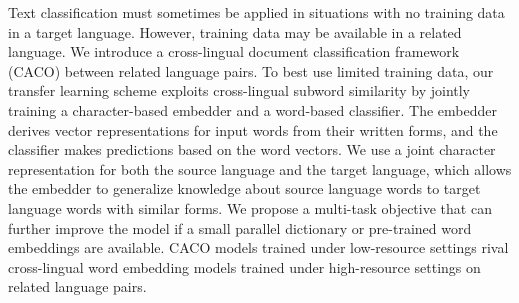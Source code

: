 Text classification must sometimes be applied in situations with no training data in a target language. However, training data may be available in a related language. We introduce a cross-lingual document classification framework (CACO) between related language pairs. To best use limited training data, our transfer learning scheme exploits cross-lingual subword similarity by jointly training a character-based embedder and a word-based classifier. The embedder derives vector representations for input words from their written forms, and the classifier makes predictions based on the word vectors. We use a joint character representation for both the source language and the target language, which allows the embedder to generalize knowledge about source language words to target language words with similar forms. We propose a multi-task objective that can further improve the model if a small parallel dictionary or pre-trained word embeddings are available. CACO models trained under low-resource settings rival cross-lingual word embedding models trained under high-resource settings on related language pairs.
